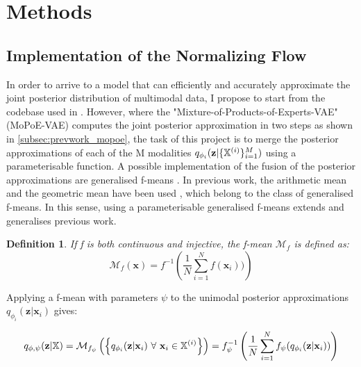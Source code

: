 \documentclass[english]{scrartcl}
\newtheorem{definition}{Definition}
\begin{document}
    \section{Methods}

    \subsection{Implementation of the Normalizing Flow}
    In order to arrive to a model that can efficiently and accurately approximate the joint posterior distribution of multimodal data, I propose to start from the codebase used in \citet{sutter_generalized_2020}.
    However, where the "Mixture-of-Products-of-Experts-VAE" (MoPoE-VAE) computes the joint posterior approximation in two steps as shown in \cref{subsec:prevwork_mopoe}, the task of this project is to merge the posterior approximations of each of the M modalities $q_{\phi_i}(\textbf{z}|\{\mathbb{X}^{(i)}\}_{i=1}^M)$ using a parameterisable function.
    A possible implementation of the fusion of the posterior approximations are generalised f-means \citep{niculescu_convex_2018}.
    In previous work, the arithmetic mean and the geometric mean have been used  \citep[PoE,MoE,MoPoE]{poe,shi_variational_2019,sutter_generalized_2020}, which belong to the class of generalised f-means.
    In this sense, using a parameterisable generalised f-means extends and generalises previous work.
    \begin{definition}
        If f is both continuous and injective, the f-mean $\mathcal{M}_f$ is defined as:
        \begin{equation}
             \mathcal{M}_{f}\left( \textbf{x} \right) = f^{-1}\left( \frac{1}{N} \sum ^N _{i=1} f(\textbf{x}_i)) \right)
        \end{equation}
    \end{definition}

    Applying a f-mean with parameters $\psi$ to the unimodal posterior approximations $q_{\phi _i}(\textbf{z}|\textbf{x}_i)$ gives:

    \begin{equation}\label{eq:merge_function}
        q_{\phi, \psi}(\textbf{z} | \mathbb{X}) = \mathcal{M}_{f_{\psi}}\left( \left\{ q_{\phi _i}(\textbf{z}|\textbf{x}_i)\ \forall\ \textbf{x}_i \in \mathbb{X}^{(i)} \right\} \right) = f_{\psi}^{-1}\left( \frac{1}{N} \sum ^N _{i=1} f_{\psi}(q_{\phi _i}(\textbf{z}|\textbf{x}_i)) \right)
    \end{equation}
\end{document}
